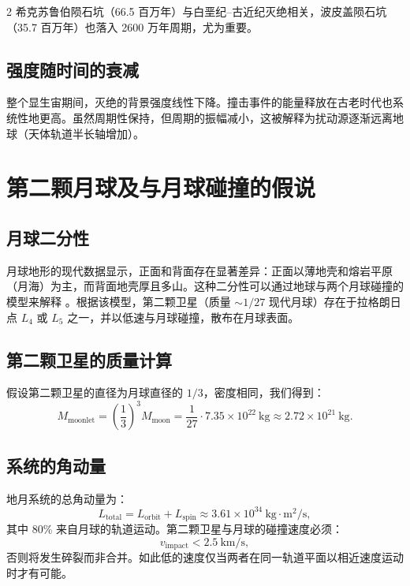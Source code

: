 \documentclass[11pt,a4paper]{article}
\begin{document}
\begin{multicols}{2}
		希克苏鲁伯陨石坑（66.5 百万年）与白垩纪–古近纪灭绝相关，波皮盖陨石坑（35.7 百万年）也落入 2600 万年周期，尤为重要。
		
		\subsection{强度随时间的衰减}
		
		整个显生宙期间，灭绝的背景强度线性下降。撞击事件的能量释放在古老时代也系统性地更高。虽然周期性保持，但周期的振幅减小，这被解释为扰动源逐渐远离地球（天体轨道半长轴增加）。
		
		\section{第二颗月球及与月球碰撞的假说}
		
		\subsection{月球二分性}
		
		月球地形的现代数据显示，正面和背面存在显著差异：正面以薄地壳和熔岩平原（月海）为主，而背面地壳厚且多山。这种二分性可以通过地球与两个月球碰撞的模型来解释 \cite{JutziAsphaug2011}。根据该模型，第二颗卫星（质量 \(\sim 1/27\) 现代月球）存在于拉格朗日点 \(L_4\) 或 \(L_5\) 之一，并以低速与月球碰撞，散布在月球表面。
		
		\subsection{第二颗卫星的质量计算}
		
		假设第二颗卫星的直径为月球直径的 \(1/3\)，密度相同，我们得到：
		{\small
			\[
			M_{\text{moonlet}} = \left(\frac{1}{3}\right)^3 M_{\text{moon}} = \frac{1}{27} \cdot 7.35 \times 10^{22}\ \text{kg} \approx 2.72 \times 10^{21}\ \text{kg}.
			\]}
		
		\subsection{系统的角动量}
		
		地月系统的总角动量为：
		\[
		L_{\text{total}} = L_{\text{orbit}} + L_{\text{spin}} \approx 3.61 \times 10^{34}\ \text{kg}\cdot\text{m}^2/\text{s},
		\]
		其中 80\% 来自月球的轨道运动。第二颗卫星与月球的碰撞速度必须：
		\[
		v_{\text{impact}} < 2.5\ \text{km/s},
		\]
		否则将发生碎裂而非合并。如此低的速度仅当两者在同一轨道平面以相近速度运动时才有可能。
		

\end{multicols}
\end{document}
